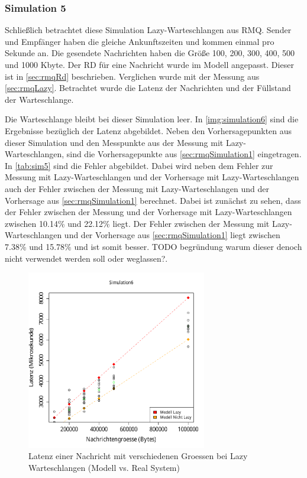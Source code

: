 \subsubsection{Simulation 5}
Schließlich betrachtet diese Simulation Lazy-Warteschlangen aus RMQ. Sender und Empfänger haben die gleiche Ankunftszeiten und kommen einmal pro Sekunde an. Die gesendete Nachrichten haben die Größe 100, 200, 300, 400, 500 und 1000 Kbyte. Der RD für eine Nachricht wurde im Modell angepasst. Dieser ist in \autoref{sec:rmqRd} beschrieben. Verglichen wurde mit der Messung aus \autoref{sec:rmqLazy}. Betrachtet wurde die Latenz der Nachrichten und der Füllstand der Warteschlange. \par
Die Warteschlange bleibt bei dieser Simulation leer. In \autoref{img:simulation6} sind die Ergebnisse bezüglich der Latenz abgebildet. Neben den Vorhersagepunkten aus dieser Simulation und den Messpunkte aus der Messung mit Lazy-Warteschlangen, sind die Vorhersagepunkte aus \autoref{sec:rmqSimulation1} eingetragen. In \autoref{tab:sim5} sind die Fehler abgebildet. Dabei wird neben dem Fehler zur Messung mit Lazy-Warteschlangen und der Vorhersage mit Lazy-Warteschlangen auch der Fehler zwischen der Messung mit Lazy-Warteschlangen und der Vorhersage aus \autoref{sec:rmqSimulation1} berechnet. Dabei ist zunächst zu sehen, dass der Fehler zwischen der Messung und der Vorhersage mit Lazy-Warteschlangen zwischen 10.14\% und 22.12\% liegt. Der Fehler zwischen der Messung mit Lazy-Warteschlangen und der Vorhersage aus \autoref{sec:rmqSimulation1} liegt zwischen 7.38\% und 15.78\% und ist somit besser. TODO begründung warum dieser denoch nicht verwendet werden soll oder weglassen?.
\begin{figure}
\center
  \includegraphics[width=0.7\textwidth]{images/modelSimulationResults/simulation6.pdf}
  \caption{Latenz einer Nachricht mit verschiedenen Groessen bei Lazy Warteschlangen (Modell vs. Real System)}
  \label{img:simulation6}
\end{figure}

